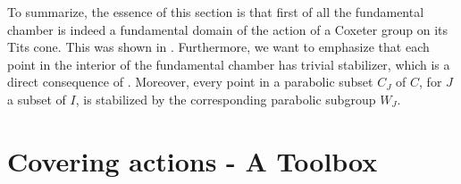 \begin{figure}[ht]
    \centering
    \qquad
\end{figure}

To summarize, the essence of this section is that first of all the fundamental chamber is indeed a fundamental domain of the action of a Coxeter group on its Tits cone.
This was shown in .
Furthermore, we want to emphasize that each point in the interior of the fundamental chamber has trivial stabilizer, which is a direct consequence of .
Moreover, every point in a parabolic subset \(C_J\) of \(C\), for \(J\) a subset of \(I\), is stabilized by the corresponding parabolic subgroup \(W_J\).



\section{Covering actions - A Toolbox}

